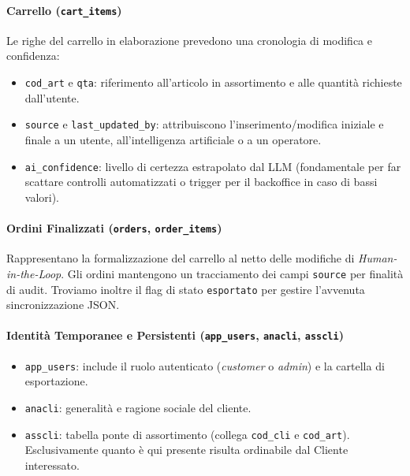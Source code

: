 \documentclass[a4paper, 11pt, oneside]{scrartcl}
\begin{document}
\paragraph{Carrello (\texttt{cart\_items})}
Le righe del carrello in elaborazione prevedono una cronologia di modifica e confidenza:
\begin{itemize}
    \item \texttt{cod\_art} e \texttt{qta}: riferimento all'articolo in assortimento e alle quantità richieste dall'utente.
    \item \texttt{source} e \texttt{last\_updated\_by}: attribuiscono l'inserimento/modifica iniziale e finale a un utente, all'intelligenza artificiale o a un operatore.
    \item \texttt{ai\_confidence}: livello di certezza estrapolato dal LLM (fondamentale per far scattare controlli automatizzati o trigger per il backoffice in caso di bassi valori).
\end{itemize}

\paragraph{Ordini Finalizzati (\texttt{orders}, \texttt{order\_items})}
Rappresentano la formalizzazione del carrello al netto delle modifiche di \textit{Human-in-the-Loop}. Gli ordini mantengono un tracciamento dei campi \texttt{source} per finalità di audit. Troviamo inoltre il flag di stato \texttt{esportato} per gestire l'avvenuta sincronizzazione JSON.

\paragraph{Identità Temporanee e Persistenti (\texttt{app\_users}, \texttt{anacli}, \texttt{asscli})}
\begin{itemize}
    \item \texttt{app\_users}: include il ruolo autenticato (\textit{customer} o \textit{admin}) e la cartella di esportazione.
    \item \texttt{anacli}: generalità e ragione sociale del cliente.
    \item \texttt{asscli}: tabella ponte di assortimento (collega \texttt{cod\_cli} e \texttt{cod\_art}). Esclusivamente quanto è qui presente risulta ordinabile dal Cliente interessato.
\end{itemize}
\end{document}
